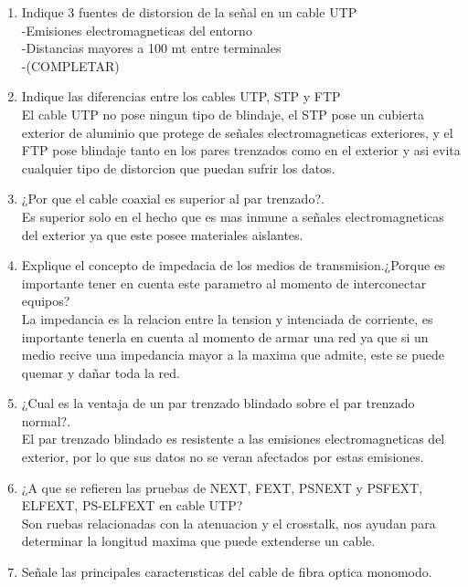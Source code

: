 \documentclass{udparticle}
\begin{document}
\begin{enumerate}
    \item Indique 3 fuentes de distorsion de la señal en un cable UTP\\
    -Emisiones electromagneticas del entorno\\
    -Distancias mayores a 100 mt entre terminales\\
    -(COMPLETAR)\\
    \item Indique las diferencias entre los cables UTP, STP y FTP\\
    El cable UTP no pose ningun tipo de blindaje, el STP pose un cubierta exterior de aluminio que protege de señales electromagneticas exteriores, y el FTP pose blindaje tanto en los pares trenzados como en el exterior y asi evita cualquier tipo de distorcion que puedan sufrir los datos.\\
    \item  ¿Por que el cable coaxial es superior al par trenzado?.\\
    Es superior solo en el hecho que es mas inmune a señales electromagneticas del exterior ya que este posee materiales aislantes.\\
    \item Explique el concepto de impedacia de los medios de transmision.¿Porque es importante tener en cuenta este parametro al momento de interconectar equipos? \\
    La impedancia es la relacion entre la tension y intenciada de corriente, es importante tenerla en cuenta al momento de armar una red ya que si un medio recive una impedancia mayor a la maxima que admite, este se puede quemar y dañar toda la red.\\
    \item ¿Cual es la ventaja de un par trenzado blindado sobre el par trenzado normal?.\\
    El par trenzado blindado es resistente a las emisiones electromagneticas del exterior, por lo que sus datos no se veran afectados por estas emisiones.\\
    \item ¿A que se reﬁeren las pruebas de NEXT, FEXT, PSNEXT y PSFEXT, ELFEXT, PS-ELFEXT en cable UTP?\\
    Son ruebas relacionadas con la atenuacion y el crosstalk, nos ayudan para determinar la longitud maxima que puede extenderse un cable.\\
  \item Señale las principales caracterısticas del cable de ﬁbra optica monomodo.\\

\end{enumerate}
\end{document}
